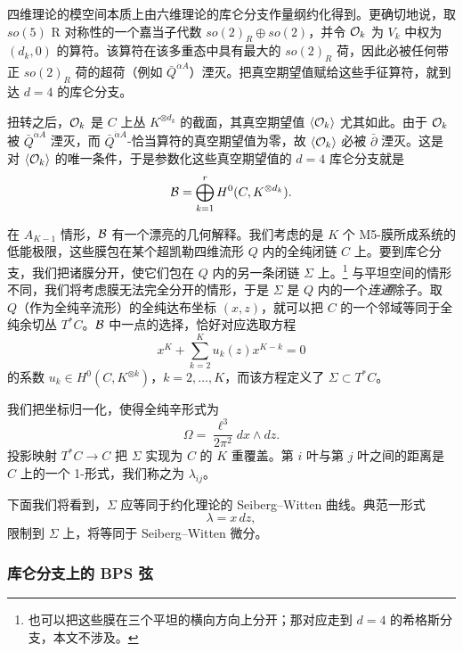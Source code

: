 四维理论的模空间本质上由六维理论的库仑分支作量纲约化得到。更确切地说，取 $so(5)$ R 对称性的一个嘉当子代数 $so(2)_R \oplus so(2)$，并令 $\mathcal{O}_k$ 为 $V_k$ 中权为 $(d_k, 0)$ 的算符。该算符在该多重态中具有最大的 $so(2)_R$ 荷，因此必被任何带正 $so(2)_R$ 荷的超荷（例如 $\bar Q^{\dot \alpha A}$）湮灭。把真空期望值赋给这些手征算符，就到达 $d=4$ 的库仑分支。

扭转之后，$\mathcal{O}_k$ 是 $C$ 上丛 $K^{\otimes d_k}$ 的截面，其真空期望值 $\langle \mathcal{O}_k \rangle$ 尤其如此。由于 $\mathcal{O}_k$ 被 $\bar Q^{\dot \alpha A}$ 湮灭，而 $\bar Q^{\dot \alpha A}$-恰当算符的真空期望值为零\cite{Witten:1988ze}，故 $\langle \mathcal{O}_k \rangle$ 必被 $\bar\partial$ 湮灭。这是对 $\langle \mathcal{O}_k \rangle$ 的唯一条件，于是参数化这些真空期望值的 $d=4$ 库仑分支就是
\begin{equation}
\mathcal{B} = \bigoplus_{k=1}^r H^0(C, K^{\otimes d_k}).
\end{equation}

在 $A_{K-1}$ 情形，$\mathcal{B}$ 有一个漂亮的几何解释。我们考虑的是 $K$ 个 M5-膜所成系统的低能极限，这些膜包在某个超凯勒四维流形 $Q$ 内的全纯闭链 $C$ 上。要到库仑分支，我们把诸膜分开，使它们包在 $Q$ 内的另一条闭链 $\Sigma$ 上。\footnote{也可以把这些膜在三个平坦的横向方向上分开；那对应走到 $d=4$ 的希格斯分支，本文不涉及。} 与平坦空间的情形不同，我们将考虑膜无法完全分开的情形，于是 $\Sigma$ 是 $Q$ 内的一个\emph{连通}除子。取 $Q$（作为全纯辛流形）的全纯达布坐标 $(x,z)$，就可以把 $C$ 的一个邻域等同于全纯余切丛 $T^*C$。$\mathcal{B}$ 中一点的选择，恰好对应选取方程
\begin{equation} \label{eq:sigma-eq}
x^K + \sum_{k=2}^K u_k(z) x^{K-k} = 0
\end{equation}
的系数 $u_k \in H^0(C, K^{\otimes k})$，$k = 2, \dots, K$，而该方程定义了 $\Sigma \subset T^* C$。

我们把坐标归一化，使得全纯辛形式为
\begin{equation}
\Omega = \frac{\ell^3}{2 \pi^2} dx \wedge dz.
\end{equation}
投影映射 $T^* C \to C$ 把 $\Sigma$ 实现为 $C$ 的 $K$ 重覆盖。第 $i$ 叶与第 $j$ 叶之间的距离是 $C$ 上的一个 1-形式，我们称之为 $\lambda_{ij}$。

下面我们将看到，$\Sigma$ 应等同于约化理论的 Seiberg–Witten 曲线。典范一形式
\begin{equation}
\lambda = x\,dz,
\end{equation}
限制到 $\Sigma$ 上，将等同于 Seiberg–Witten 微分。

\subsubsection{库仑分支上的 BPS 弦} \label{sec:bps-strings}


